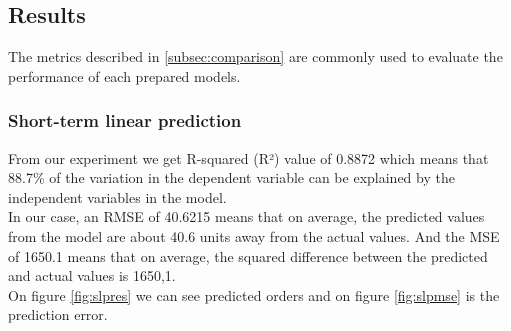     \subsection{Results} \label{subsec:experimentResults}
        The metrics described in \ref{subsec:comparison} are commonly used to evaluate
        the performance of each prepared models.
        \subsubsection{Short-term linear prediction} \label{subsec:res_slp}
        From our experiment we get R-squared (R²) value of 0.8872 which means that
        88.7\% of the variation in the dependent variable can be explained
        by the independent variables in the model.\\
        In our case, an RMSE of 40.6215 means that on average, the predicted values
        from the model are about 40.6 units away from the actual values.
        And the MSE of 1650.1 means that on average, the squared difference between the
        predicted and actual values is 1650,1.\\
        On figure \ref{fig:slpres} we can see predicted orders and on figure \ref{fig:slpmse}
        is the prediction error. 
